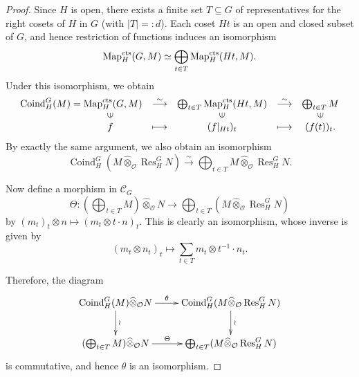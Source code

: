 \documentclass{article}
\numberwithin{equation}{section} %
\begin{document}
    \begin{proof}
      Since $H$ is open, there exists a finite set $T \subseteq G$ of representatives for the right cosets of $H$ in $G$ (with $|T|=:d$). Each coset $Ht$ is an open and closed subset of $G$, and hence restriction of functions induces an isomorphism
      \[
        \operatorname{Map}_H^{\rm cts}(G,M)
        \simeq
        \bigoplus_{t\in T}\operatorname{Map}_H^{\rm cts}(Ht,M).
      \]
      Under this isomorphism, we obtain
      \[
        \begin{array}{ccccc}
\operatorname{Coind}_H^G(M) = \operatorname{Map}_H^{\rm cts}(G,M)
& \stackrel{\sim}{\longrightarrow} &
\bigoplus_{t \in T} \operatorname{Map}_H^{\rm cts}(Ht,M)
& \stackrel{\sim}{\longrightarrow} &
\bigoplus_{t\in T}M\\
\qquad\qquad\qquad\rotatebox{90}{$\in$}
&
&
\rotatebox{90}{$\in$}
&
&
\rotatebox{90}{$\in$}\\
\qquad\qquad\qquad f
& \longmapsto &
(f|_{Ht})_t
&\longmapsto  &
(f(t))_t.
\end{array}
      \]
      By exactly the same argument, we also obtain an isomorphism
      \[
      \operatorname{Coind}_H^G(M \widehat{\otimes}_{\mathcal{O}}\operatorname{Res}_H^G N)
      \overset{\sim}{\longrightarrow}
      \bigoplus_{t\in T}
      M \widehat{\otimes}_{\mathcal{O}}\operatorname{Res}_H^G N.
      \]

      Now define a morphism in $\mathscr{C}_G$
      \[
        \Theta:
        \left(\bigoplus_{t \in T} M\right)
        \widehat{\otimes}_{\mathcal{O}} N
        \longrightarrow
        \bigoplus_{t\in T}
        \left(M \widehat{\otimes}_{\mathcal{O}}\operatorname{Res}_H^G N\right)
      \]
      by $(m_t)_t \otimes n
        \mapsto
        (m_t\otimes t \cdot n)_t$. This is clearly an isomorphism, whose inverse is given by
      \[
        (m_t\otimes n_t)_t
        \longmapsto
        \sum_{t\in T} m_t \otimes t^{-1}\cdot n_t.
      \]

      Therefore, the diagram
      \[
        \xymatrix{
          \operatorname{Coind}_H^G(M) \widehat{\otimes}_{\mathcal{O}} N \ar[r]^-{\theta} \ar[d]^-{\wr} &
          \operatorname{Coind}_H^G(M \widehat{\otimes}_{\mathcal{O}}\operatorname{Res}_H^G N) \ar[d]^-{\wr} \\
          (\bigoplus_{t \in T} M) \widehat{\otimes}_{\mathcal{O}} N \ar[r]^-{\Theta} &
          \bigoplus_{t\in T} (M \widehat{\otimes}_{\mathcal{O}}\operatorname{Res}_H^G N)
        }
      \]
      is commutative, and hence $\theta$ is an isomorphism.
    \end{proof}
\end{document}

